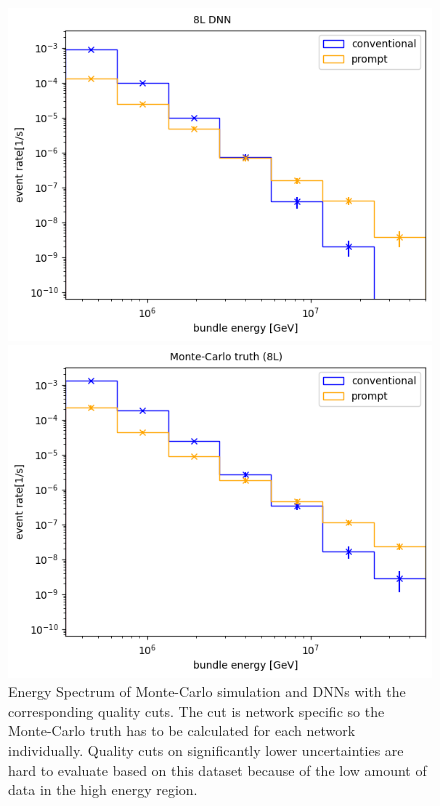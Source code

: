 \documentclass[
  tucolor,       %
  BCOR=12mm,     %
  parskip=half,  %
  open=any,      %
  cleardoublepage=plain,  %
]{tudothesis}
\begin{document}
\begin{figure}
\begin{minipage}[t]{0.49\textwidth}
    \includegraphics[width=\textwidth]{Plots/muon flux std dnn bundle cut}
  \end{minipage}
  \begin{minipage}[t]{0.49\textwidth}
    \includegraphics[width=\textwidth]{Plots/muon flux monte carlo bundle 8L cut}
  \end{minipage}
  \caption{Energy Spectrum of Monte-Carlo simulation and DNNs with the corresponding quality cuts. The cut is network specific so the Monte-Carlo truth has to be calculated for each network individually. Quality cuts on significantly lower uncertainties are hard to evaluate based on this dataset because of the low amount of data in the high energy region.}
  \label{fig:Energy spectrum DNNs cut}
\end{figure}
\end{document}

